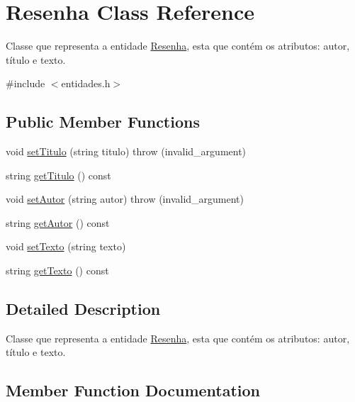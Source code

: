\hypertarget{classResenha}{}\section{Resenha Class Reference}
\label{classResenha}


Classe que representa a entidade \hyperlink{classResenha}{Resenha}, esta que contém os atributos\+: autor, título e texto.  




{\ttfamily \#include $<$entidades.\+h$>$}

\subsection*{Public Member Functions}
\begin{DoxyCompactItemize}
\item 
void \hyperlink{classResenha_aa2e063e37df9f280258bf1bb492bf818}{set\+Titulo} (string titulo)  throw (invalid\+\_\+argument)
\item 
string \hyperlink{classResenha_a8c0966bc51ba8d43c769594446797d9f}{get\+Titulo} () const
\item 
void \hyperlink{classResenha_a5c12319c40b3001ba8b6771e2a86285b}{set\+Autor} (string autor)  throw (invalid\+\_\+argument)
\item 
string \hyperlink{classResenha_a9ba7b00c49de97e2c29caba9b229dfab}{get\+Autor} () const
\item 
void \hyperlink{classResenha_ad760365db2202742706238d74fe55e6e}{set\+Texto} (string texto)
\item 
string \hyperlink{classResenha_a17b193d598f0b50f90310a67afc0b524}{get\+Texto} () const
\end{DoxyCompactItemize}


\subsection{Detailed Description}
Classe que representa a entidade \hyperlink{classResenha}{Resenha}, esta que contém os atributos\+: autor, título e texto. 

\subsection{Member Function Documentation}
\mbox{\label{classResenha_a9ba7b00c49de97e2c29caba9b229dfab}} 

